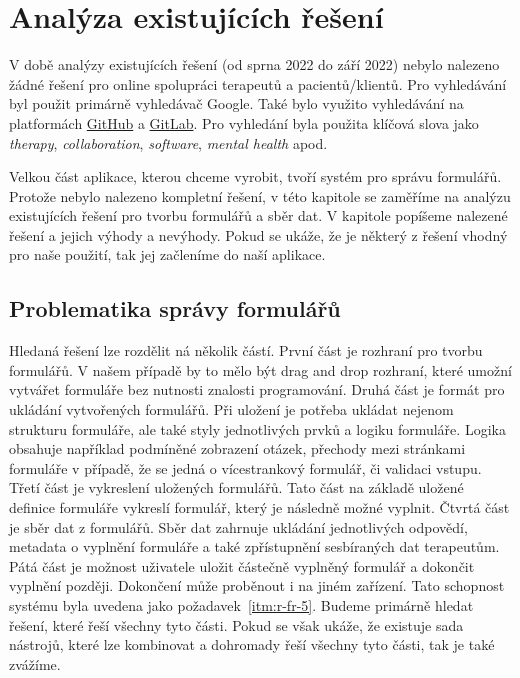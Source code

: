 \chapter{Analýza existujících řešení}\label{ch:analyza-existujicich-reseni-pro-praci-s-formulari}

V době analýzy existujících řešení (od sprna 2022 do září 2022) nebylo nalezeno žádné řešení pro online spolupráci terapeutů a pacientů/klientů.
Pro vyhledávání byl použit primárně vyhledávač Google.
Také bylo využito vyhledávání na platformách \href{https://github.com/}{GitHub} a \href{https://about.gitlab.com/}{GitLab}.
Pro vyhledání byla použita klíčová slova jako \textit{therapy}, \textit{collaboration}, \textit{software}, \textit{mental health} apod.

Velkou část aplikace, kterou chceme vyrobit, tvoří systém pro správu formulářů.
Protože nebylo nalezeno kompletní řešení, v této kapitole se zaměříme na analýzu existujících řešení pro tvorbu formulářů a sběr dat.
V kapitole popíšeme nalezené řešení a jejich výhody a nevýhody.
Pokud se ukáže, že je některý z řešení vhodný pro naše použití, tak jej začleníme do naší aplikace.


\section{Problematika správy formulářů}\label{sec:problematika-spravy-formularu}

Hledaná řešení lze rozdělit ná několik částí.
První část je rozhraní pro tvorbu formulářů.
V našem případě by to mělo být drag and drop rozhraní, které umožní vytvářet formuláře bez nutnosti znalosti programování.
Druhá část je formát pro ukládání vytvořených formulářů.
Při uložení je potřeba ukládat nejenom strukturu formuláře, ale také styly jednotlivých prvků a logiku formuláře.
Logika obsahuje například podmíněné zobrazení otázek, přechody mezi stránkami formuláře v případě, že se jedná o vícestrankový formulář, či validaci vstupu.
Třetí část je vykreslení uložených formulářů.
Tato část na základě uložené definice formuláře vykreslí formulář, který je následně možné vyplnit.
Čtvrtá část je sběr dat z formulářů.
Sběr dat zahrnuje ukládání jednotlivých odpovědí, metadata o vyplnění formuláře a také zpřístupnění sesbíraných dat terapeutům.
Pátá část je možnost uživatele uložit částečně vyplněný formulář a dokončit vyplnění později.
Dokončení může proběnout i na jiném zařízení.
Tato schopnost systému byla uvedena jako požadavek~\ref{itm:r-fr-5}.
Budeme primárně hledat řešení, které řeší všechny tyto části.
Pokud se však ukáže, že existuje sada nástrojů, které lze kombinovat a dohromady řeší všechny tyto části, tak je také zvážíme.

